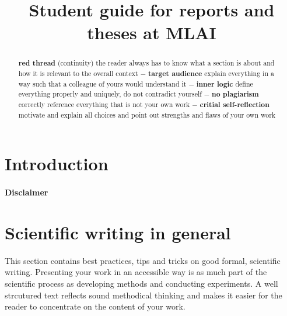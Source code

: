 \documentclass[nodate]{proc}
\date{} %
\begin{document}
\title{\textbf{Student guide for reports and theses at MLAI}}
% 		

\maketitle

\begin{abstract}
	 \textbf{red thread} (continuity) the reader always has to know what a section is about and how it is relevant to the overall context $-$ \textbf{target audience} explain everything in a way such that a colleague of yours would understand it $-$ \textbf{inner logic} define everything properly and uniquely, do not contradict yourself  $-$ \textbf{no plagiarism} correctly reference everything that is not your own work  $-$ \textbf{critial self-reflection} motivate and explain all choices and point out strengths and flaws of your own work
\end{abstract}

\tableofcontents


\section{Introduction}

\paragraph{Disclaimer}

\section{Scientific writing in general}
This section contains best practices, tips and tricks on good formal, scientific writing. Presenting your work in an accessible way is as much part of the scientific process as developing methods and conducting experiments. A well strcutured text reflects sound methodical thinking and makes it easier for the reader to concentrate on the content of your work.
\end{document}
